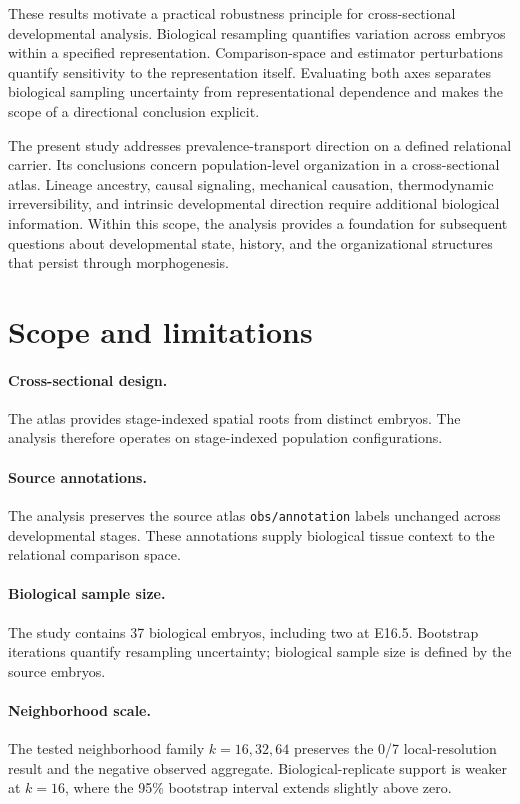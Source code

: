 \documentclass[11pt]{article}
\begin{document}
These results motivate a practical robustness principle for cross-sectional developmental analysis. Biological resampling quantifies variation across embryos within a specified representation. Comparison-space and estimator perturbations quantify sensitivity to the representation itself. Evaluating both axes separates biological sampling uncertainty from representational dependence and makes the scope of a directional conclusion explicit.

The present study addresses prevalence-transport direction on a defined relational carrier. Its conclusions concern population-level organization in a cross-sectional atlas. Lineage ancestry, causal signaling, mechanical causation, thermodynamic irreversibility, and intrinsic developmental direction require additional biological information. Within this scope, the analysis provides a foundation for subsequent questions about developmental state, history, and the organizational structures that persist through morphogenesis.


\newpage
\section{Scope and limitations}

\paragraph{Cross-sectional design.}
The atlas provides stage-indexed spatial roots from distinct embryos. The analysis therefore operates on stage-indexed population configurations.

\paragraph{Source annotations.}
The analysis preserves the source atlas \texttt{obs/annotation} labels unchanged across developmental stages. These annotations supply biological tissue context to the relational comparison space.

\paragraph{Biological sample size.}
The study contains 37 biological embryos, including two at E16.5. Bootstrap iterations quantify resampling uncertainty; biological sample size is defined by the source embryos.

\paragraph{Neighborhood scale.}
The tested neighborhood family $k=16,32,64$ preserves the 0/7 local-resolution result and the negative observed aggregate. Biological-replicate support is weaker at $k=16$, where the 95\% bootstrap interval extends slightly above zero.
\end{document}

